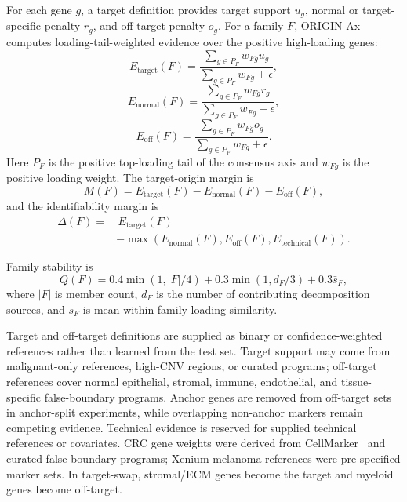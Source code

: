 \documentclass[conference]{IEEEtran}
\begin{document}
For each gene $g$, a target definition provides target support $u_g$, normal
or target-specific penalty $r_g$, and off-target penalty $o_g$. For a family
$F$, ORIGIN-Ax computes loading-tail-weighted evidence over the positive
high-loading genes:
\begin{equation}
E_{\mathrm{target}}(F)=
\frac{\sum_{g\in P_F}w_{Fg}u_g}
{\sum_{g\in P_F}w_{Fg}+\epsilon},
\end{equation}
\begin{equation}
E_{\mathrm{normal}}(F)=
\frac{\sum_{g\in P_F}w_{Fg}r_g}
{\sum_{g\in P_F}w_{Fg}+\epsilon},
\end{equation}
\begin{equation}
E_{\mathrm{off}}(F)=
\frac{\sum_{g\in P_F}w_{Fg}o_g}
{\sum_{g\in P_F}w_{Fg}+\epsilon}.
\end{equation}
Here $P_F$ is the positive top-loading tail of the consensus axis and $w_{Fg}$
is the positive loading weight. The target-origin margin is
\[
M(F)=E_{\mathrm{target}}(F)-E_{\mathrm{normal}}(F)-E_{\mathrm{off}}(F),
\]
and the identifiability margin is
\begin{equation}
\begin{split}
\Delta(F)=&\,E_{\mathrm{target}}(F)\\
&-\max(E_{\mathrm{normal}}(F),E_{\mathrm{off}}(F),
E_{\mathrm{technical}}(F)).
\end{split}
\end{equation}

Family stability is
\begin{equation}
Q(F)=0.4\min(1,|F|/4)+0.3\min(1,d_F/3)+0.3\bar{s}_F,
\end{equation}
where $|F|$ is member count, $d_F$ is the number of contributing decomposition
sources, and $\bar{s}_F$ is mean within-family loading similarity.

Target and off-target definitions are supplied as binary or confidence-weighted
references rather than learned from the test set. Target support may come from
malignant-only references, high-CNV regions, or curated programs; off-target
references cover normal epithelial, stromal, immune, endothelial, and
tissue-specific false-boundary programs. Anchor genes are removed from
off-target sets in anchor-split experiments, while overlapping non-anchor
markers remain competing evidence. Technical evidence is reserved for supplied
technical references or covariates. CRC gene weights were derived from
CellMarker~\cite{zhang2019cellmarker} and curated false-boundary programs;
Xenium melanoma references were pre-specified marker sets. In target-swap,
stromal/ECM genes become the target and myeloid genes become off-target.
\end{document}
